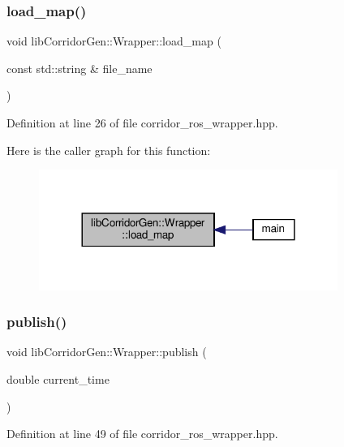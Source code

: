 \subsubsection{\texorpdfstring{load\+\_\+map()}{load\_map()}}
{\footnotesize\ttfamily void lib\+Corridor\+Gen\+::\+Wrapper\+::load\+\_\+map (\begin{DoxyParamCaption}\item[{const std\+::string \&}]{file\+\_\+name }\end{DoxyParamCaption})\hspace{0.3cm}{\ttfamily [inline]}}



Definition at line 26 of file corridor\+\_\+ros\+\_\+wrapper.\+hpp.

Here is the caller graph for this function\+:
\nopagebreak
\begin{figure}[H]
\begin{center}
\leavevmode
\includegraphics[width=276pt]{classlib_corridor_gen_1_1_wrapper_a8e09f2a4a14001ae5c7f34adbc813402_icgraph}
\end{center}
\end{figure}
\mbox{\label{classlib_corridor_gen_1_1_wrapper_af245b12ced576cd5623c399eb1ba84c1}} 
\subsubsection{\texorpdfstring{publish()}{publish()}}
{\footnotesize\ttfamily void lib\+Corridor\+Gen\+::\+Wrapper\+::publish (\begin{DoxyParamCaption}\item[{double}]{current\+\_\+time }\end{DoxyParamCaption})\hspace{0.3cm}{\ttfamily [inline]}}



Definition at line 49 of file corridor\+\_\+ros\+\_\+wrapper.\+hpp.

